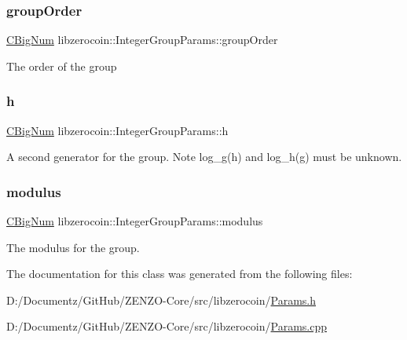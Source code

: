 \subsubsection{\texorpdfstring{groupOrder}{groupOrder}}
{\footnotesize\ttfamily \mbox{\hyperlink{class_c_big_num}{C\+Big\+Num}} libzerocoin\+::\+Integer\+Group\+Params\+::group\+Order}

The order of the group \mbox{\label{classlibzerocoin_1_1_integer_group_params_a23e945fc61cb016c144e22a1cc01e96a}} 
\subsubsection{\texorpdfstring{h}{h}}
{\footnotesize\ttfamily \mbox{\hyperlink{class_c_big_num}{C\+Big\+Num}} libzerocoin\+::\+Integer\+Group\+Params\+::h}

A second generator for the group. Note log\+\_\+g(h) and log\+\_\+h(g) must be unknown. \mbox{\label{classlibzerocoin_1_1_integer_group_params_a2bf8badb9ba3a76672fa10e375fde097}} 
\subsubsection{\texorpdfstring{modulus}{modulus}}
{\footnotesize\ttfamily \mbox{\hyperlink{class_c_big_num}{C\+Big\+Num}} libzerocoin\+::\+Integer\+Group\+Params\+::modulus}

The modulus for the group. 

The documentation for this class was generated from the following files\+:\begin{DoxyCompactItemize}
\item 
D\+:/\+Documentz/\+Git\+Hub/\+Z\+E\+N\+Z\+O-\/\+Core/src/libzerocoin/\mbox{\hyperlink{_params_8h}{Params.\+h}}\item 
D\+:/\+Documentz/\+Git\+Hub/\+Z\+E\+N\+Z\+O-\/\+Core/src/libzerocoin/\mbox{\hyperlink{_params_8cpp}{Params.\+cpp}}\end{DoxyCompactItemize}
